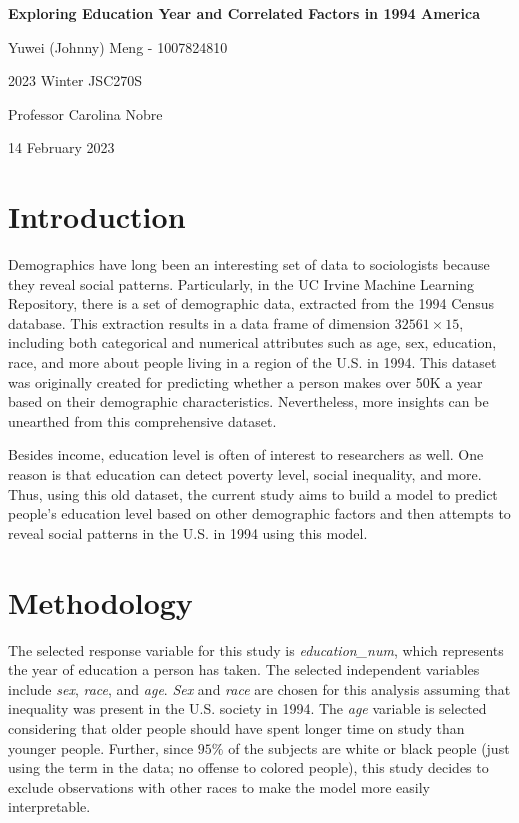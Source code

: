 \documentclass[12pt]{report}
\begin{document}
\begin{titlepage}
    \centering
    \vspace*{5cm}
    {\Large \textbf{Exploring Education Year and Correlated Factors in 1994 America}}

    \vspace{3cm}

    {\large Yuwei (Johnny) Meng - 1007824810}

    {\large 2023 Winter JSC270S}

    {\large Professor Carolina Nobre}

    {\large 14 February 2023}
\end{titlepage}

\section*{\large Introduction}

Demographics have long been an interesting set of data to sociologists because they reveal social patterns. Particularly, in the UC Irvine Machine Learning Repository, there is a set of demographic data, extracted from the 1994 Census database. This extraction results in a data frame of dimension $32561\times 15$, including both categorical and numerical attributes such as age, sex, education, race, and more about people living in a region of the U.S. in 1994. This dataset was originally created for predicting whether a person makes over 50K a year based on their demographic characteristics. Nevertheless, more insights can be unearthed from this comprehensive dataset.

Besides income, education level is often of interest to researchers as well. One reason is that education can detect poverty level, social inequality, and more. Thus, using this old dataset, the current study aims to build a model to predict people's education level based on other demographic factors and then attempts to reveal social patterns in the U.S. in 1994 using this model.

\section*{\large Methodology}

The selected response variable for this study is \textit{education\_num}, which represents the year of education a person has taken. The selected independent variables include \textit{sex}, \textit{race}, and \textit{age}. \textit{Sex} and \textit{race} are chosen for this analysis assuming that inequality was present in the U.S. society in 1994. The \textit{age} variable is selected considering that older people should have spent longer time on study than younger people. Further, since $95\%$ of the subjects are white or black people (just using the term in the data; no offense to colored people), this study decides to exclude observations with other races to make the model more easily interpretable.
\end{document}
